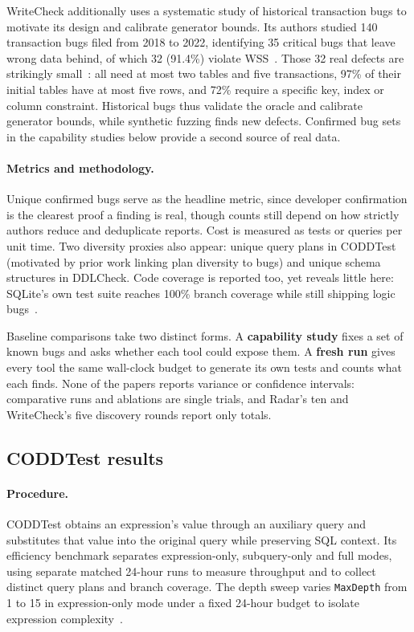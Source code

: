 WriteCheck additionally uses a systematic study of historical transaction bugs to motivate its design and calibrate generator bounds. Its authors studied 140 transaction bugs filed from 2018 to 2022, identifying 35 critical bugs that leave wrong data behind, of which 32 (91.4\%) violate WSS~\cite{writecheck}. Those 32 real defects are strikingly small~\cite[Fig.~2]{writecheck}: all need at most two tables and five transactions, 97\% of their initial tables have at most five rows, and 72\% require a specific key, index or column constraint. Historical bugs thus validate the oracle and calibrate generator bounds, while synthetic fuzzing finds new defects. Confirmed bug sets in the capability studies below provide a second source of real data.

\paragraph{Metrics and methodology.} Unique confirmed bugs serve as the headline metric, since developer confirmation is the clearest proof a finding is real, though counts still depend on how strictly authors reduce and deduplicate reports. Cost is measured as tests or queries per unit time. Two diversity proxies also appear: unique query plans in CODDTest (motivated by prior work linking plan diversity to bugs) and unique schema structures in DDLCheck. Code coverage is reported too, yet reveals little here: SQLite's own test suite reaches 100\% branch coverage while still shipping logic bugs~\cite[Sec.~4.3]{coddtest}.

Baseline comparisons take two distinct forms. A \textbf{capability study} fixes a set of known bugs and asks whether each tool could expose them. A \textbf{fresh run} gives every tool the same wall-clock budget to generate its own tests and counts what each finds. None of the papers reports variance or confidence intervals: comparative runs and ablations are single trials, and Radar's ten and WriteCheck's five discovery rounds report only totals.

\subsection{CODDTest results}
\paragraph{Procedure.} CODDTest obtains an expression's value through an auxiliary query and substitutes that value into the original query while preserving SQL context. Its efficiency benchmark separates expression-only, subquery-only and full modes, using separate matched 24-hour runs to measure throughput and to collect distinct query plans and branch coverage. The depth sweep varies \texttt{MaxDepth} from 1 to 15 in expression-only mode under a fixed 24-hour budget to isolate expression complexity~\cite[Sec.~4.3]{coddtest}.

